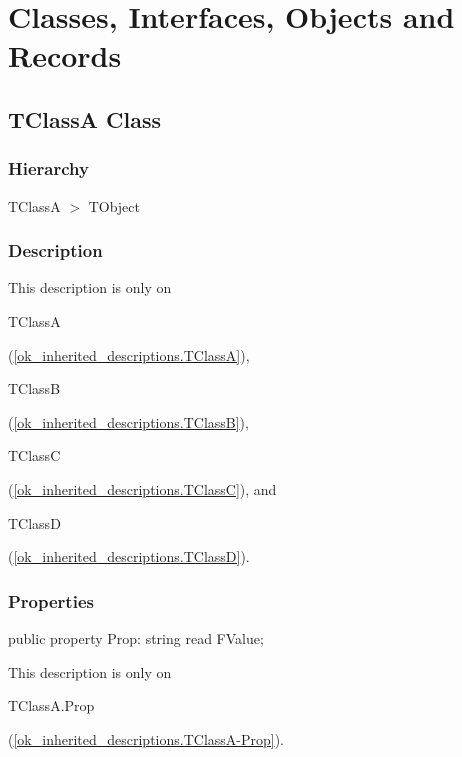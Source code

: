 \documentclass{report}
\newif\ifpdf
\begin{document}
\section{Classes, Interfaces, Objects and Records}
\ifpdf
\subsection*{\large{\textbf{TClassA Class}}\normalsize\hspace{1ex}\hrulefill}
\else
\subsection*{TClassA Class}
\fi
\label{ok_inherited_descriptions.TClassA}
\subsubsection*{\large{\textbf{Hierarchy}}\normalsize\hspace{1ex}\hfill}
TClassA {$>$} TObject
\subsubsection*{\large{\textbf{Description}}\normalsize\hspace{1ex}\hfill}
This description is only on \begin{ttfamily}TClassA\end{ttfamily}(\ref{ok_inherited_descriptions.TClassA}), \begin{ttfamily}TClassB\end{ttfamily}(\ref{ok_inherited_descriptions.TClassB}), \begin{ttfamily}TClassC\end{ttfamily}(\ref{ok_inherited_descriptions.TClassC}), and \begin{ttfamily}TClassD\end{ttfamily}(\ref{ok_inherited_descriptions.TClassD}).\subsubsection*{\large{\textbf{Properties}}\normalsize\hspace{1ex}\hfill}
\begin{list}{}{
\setlength{\itemindent}{0cm}
\setlength{\listparindent}{0cm}
\setlength{\leftmargin}{\evensidemargin}
\addtolength{\leftmargin}{\tmplength}
\settowidth{\labelsep}{X}
\addtolength{\leftmargin}{\labelsep}
\setlength{\labelwidth}{\tmplength}
}
\label{ok_inherited_descriptions.TClassA-Prop}
\item[\textbf{Prop}\hfill]
\ifpdf
\begin{flushleft}
\fi
\begin{ttfamily}
public property Prop: string read FValue;\end{ttfamily}

\ifpdf
\end{flushleft}
\fi


\par This description is only on \begin{ttfamily}TClassA.Prop\end{ttfamily}(\ref{ok_inherited_descriptions.TClassA-Prop}).\end{list}
\end{document}

